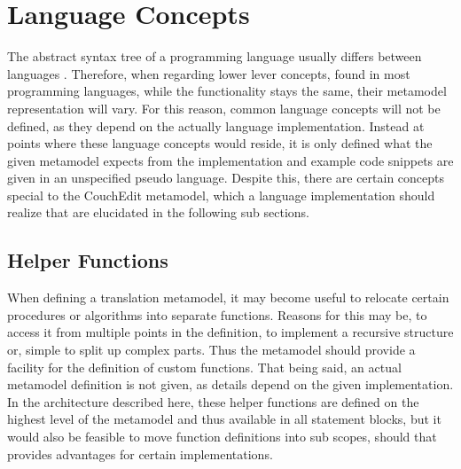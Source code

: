 \section{Language Concepts}
The abstract syntax tree of a programming language usually differs between languages . Therefore, when regarding lower lever concepts, found in most programming languages, while the functionality stays the same, their metamodel representation will vary. For this reason, common language concepts will not be defined, as they depend on the actually language implementation. Instead at points where these language concepts would reside, it is only defined what the given metamodel expects from the implementation and example code snippets are given in an unspecified pseudo language. Despite this, there are certain concepts special to the CouchEdit metamodel, which a language implementation should realize that are elucidated in the following sub sections.


\subsection{Helper Functions}
When defining a translation metamodel, it may become useful to relocate certain procedures or algorithms into separate functions. Reasons for this may be, to access it from multiple points in the definition, to implement a recursive structure or, simple to split up complex parts. Thus the metamodel should provide a facility for the definition of custom functions. That being said, an actual metamodel definition is not given, as details depend on the given implementation. In the architecture described here, these helper functions are defined on the highest level of the metamodel and thus available in all statement blocks, but it would also be feasible to move function definitions into sub scopes, should that provides advantages for certain implementations. 

